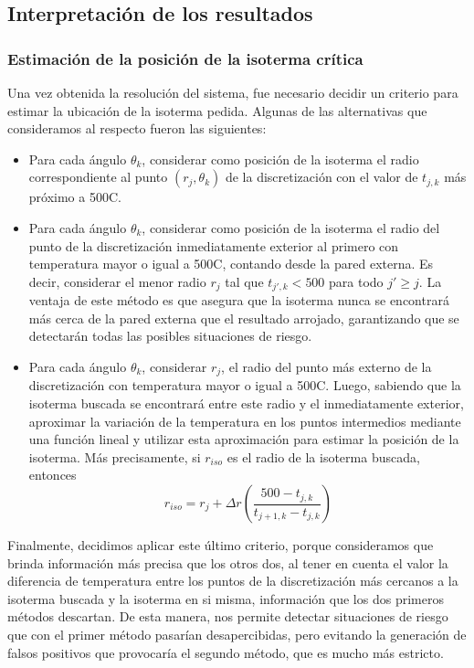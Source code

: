   \subsection{Interpretación de los resultados}

    \subsubsection{Estimación de la posición de la isoterma crítica}

      Una vez obtenida la resolución del sistema, fue necesario decidir un criterio para estimar la ubicación de la isoterma pedida. Algunas de las alternativas que consideramos al respecto fueron las siguientes:

      \begin{itemize}
        \item Para cada ángulo $\theta_k$, considerar como posición de la isoterma el radio correspondiente al punto $(r_j, \theta_k)$ de la discretización con el valor de $t_{j,k}$ más próximo a 500{\degree}C.
        \item Para cada ángulo $\theta_k$, considerar como posición de la isoterma el radio del punto de la discretización inmediatamente exterior al primero con temperatura mayor o igual a 500{\degree}C, contando desde la pared externa. Es decir, considerar el menor radio $r_j$ tal que $t_{j',k} < 500$ para todo $j' \geq j$. La ventaja de este método es que asegura que la isoterma nunca se encontrará más cerca de la pared externa que el resultado arrojado, garantizando que se detectarán todas las posibles situaciones de riesgo.
        \item Para cada ángulo $\theta_k$, considerar $r_j$, el radio del punto más externo de la discretización con temperatura mayor o igual a 500{\degree}C. Luego, sabiendo que la isoterma buscada se encontrará entre este radio y el inmediatamente exterior, aproximar la variación de la temperatura en los puntos intermedios mediante una función lineal y utilizar esta aproximación para estimar la posición de la isoterma. Más precisamente, si $r_{iso}$ es el radio de la isoterma buscada, entonces
          \[ r_{iso} = r_j + \Delta r \left(\frac{500 - t_{j,k}}{t_{j+1,k} - t_{j,k}} \right) \]
      \end{itemize}

      Finalmente, decidimos aplicar este último criterio, porque consideramos que brinda información más precisa que los otros dos, al tener en cuenta el valor la diferencia de temperatura entre los puntos de la discretización más cercanos a la isoterma buscada y la isoterma en si misma, información que los dos primeros métodos descartan. De esta manera, nos permite detectar situaciones de riesgo que con el primer método pasarían desapercibidas, pero evitando la generación de falsos positivos que provocaría el segundo método, que es mucho más estricto.

